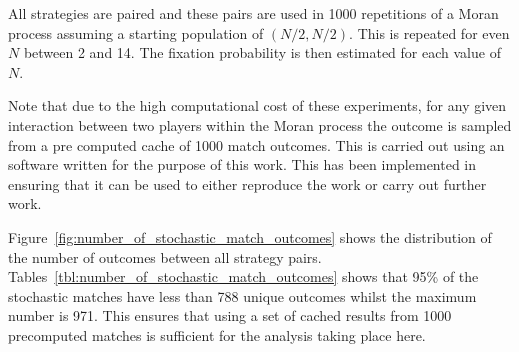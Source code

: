 \documentclass{article}
\begin{document}
All strategies are paired and these pairs are used in 1000 repetitions of a
Moran process assuming a starting population of \((N/2, N/2)\). This is repeated
for even \(N\) between 2 and 14. The fixation probability is then estimated for
each value of \(N\).

Note that due to the high computational cost of these experiments, for any given
interaction between two players within the Moran process the outcome is sampled
from a pre computed cache of 1000 match outcomes. This is carried out using an
software written for the purpose of this work. This has been
implemented in \cite{axelrodproject} ensuring that it can be used to either
reproduce the work or carry out further work.

Figure~\ref{fig:number_of_stochastic_match_outcomes} shows the distribution of
the number of outcomes between all strategy pairs.
Tables~\ref{tbl:number_of_stochastic_match_outcomes} shows that 95\% of the
stochastic matches have less than 788 unique outcomes whilst the maximum number
is 971. This ensures that using a set of cached results from 1000 precomputed
matches is sufficient for the analysis taking place here.
\end{document}
